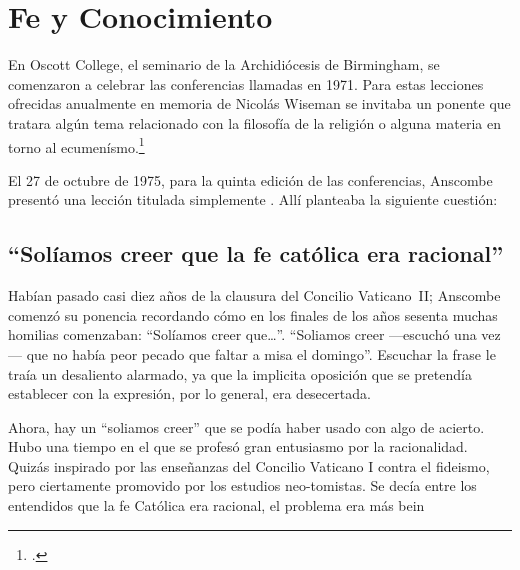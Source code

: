 \section{Fe y Conocimiento}

En Oscott College, el seminario de la Archidiócesis de Birmingham, se comenzaron a celebrar las conferencias llamadas  en 1971. 
Para estas lecciones ofrecidas anualmente en memoria de Nicolás Wiseman se invitaba un ponente que tratara algún tema relacionado con la filosofía de la religión o alguna materia en torno al ecumenísmo.\footcite[cf.~][p.~7]{wisemanlects}

El 27 de octubre de 1975, para la quinta edición de las conferencias, Anscombe presentó una lección titulada simplemente . 
Allí planteaba la siguiente cuestión:



\subsection{``Solíamos creer que la fe católica era racional''}
Habían pasado casi diez años de la clausura del Concilio \mbox{Vaticano II}; Anscombe comenzó su ponencia recordando cómo en los finales de los años sesenta muchas homilias comenzaban: ``Solíamos creer que\ldots''. ``Soliamos creer ---escuchó una vez--- que no había peor pecado que faltar a misa el domingo''. Escuchar la frase le traía un desaliento alarmado, ya que la implicita oposición que se pretendía establecer con la expresión, por lo general, era desecertada. 

Ahora, hay un ``soliamos creer'' que se podía haber usado con algo de acierto. Hubo una tiempo en el que se profesó gran entusiasmo por la racionalidad. Quizás inspirado por las enseñanzas del Concilio Vaticano I contra el fideismo, pero ciertamente promovido por los estudios neo-tomistas. Se decía entre los entendidos que la fe Católica era racional, el problema era más bein

